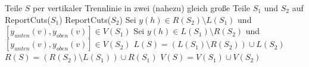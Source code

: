 \documentclass{article}
\begin{document}
\begin{algorithm}[ht]
{    Teile $S$ per vertikaler Trennlinie in zwei (nahezu) gleich gro{\ss}e Teile $S_1$ und $S_2$ auf\;%
    \BlankLine\BlankLine%
    ReportCuts($S_1$)\;%
    ReportCuts($S_2$)\;%
    \BlankLine\BlankLine%
    Sei $y(h)\in R(S_2) \setminus L(S_1)$ und $[y_{unten}(v), y_{oben}(v)]\in V(S_1)$\;%
    \BlankLine\BlankLine%
    Sei $y(h)\in L(S_1) \setminus R(S_2)$ und $[y_{unten}(v), y_{oben}(v)]\in V(S_2)$\;%
    \BlankLine\BlankLine%
    $L(S) = \left( L(S_1) \setminus R(S_2) \right) \cup L(S_2)$\;
    $R(S) = \left( R(S_2) \setminus L(S_1) \right) \cup R(S_1)$\;
    $V(S) = V(S_1) \cup V(S_2)$\;
  }%
\end{algorithm}
\end{document}

